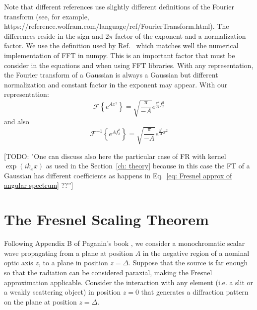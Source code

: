 \documentclass{iucr}              %
\newcommand{\todo}[1]{{\color{red}[TODO: "#1'']}}
\newcommand{\inblue}[1]{{\color{blue}#1}}
\begin{document}
Note that different references use slightly different definitions of the Fourier transform (see, for example, \inblue{https://reference.wolfram.com/language/ref/FourierTransform.html}). The differences reside in the sign and $2 \pi$ factor of the exponent and a normalization factor. We use the definition used by Ref.~\cite{goodmanfourier} which matches well the numerical implementation of FFT in numpy. This is an important factor that must be consider in the equations and when using FFT libraries. With any representation, the Fourier transform of a Gaussian is always a Gaussian but different normalization and constant factor in the exponent may appear. With our representation:
\begin{equation}
\mathcal{F}\left\{ e^{A x^2} \right\} = \sqrt{\frac{\pi}{-A}} e^{\frac{\pi^2}{A} f_x^2}
\end{equation}
and also
\begin{equation}
\mathcal{F}^{-1}\left\{ e^{A f_x^2} \right\} = \sqrt{\frac{\pi}{-A}} e^{\frac{\pi^2}{A} x^2}
\end{equation}

\todo{One can discuss also here the particular case of FR with kernel $\exp(ik_x x)$ as used in the Section~\ref{ch: theory} because in this case the FT of a Gaussian has different coefficients as happens in Eq.~\ref{eq: Fresnel approx of angular spectrum} ??}

\section{The Fresnel Scaling Theorem}
\label{appendix: scaling}

Following Appendix B of Paganin's book \cite{paganin_book}, we consider a monochromatic scalar wave propagating from a plane at position $A$ in the negative region of a nominal optic axis $z$, to a plane in position $z=\Delta$. Suppose that the source is far enough so that the radiation can be considered paraxial, making the Fresnel approximation applicable. Consider the interaction with any element (i.e. a slit or a weakly scattering object) in position $z=0$ that generates a diffraction pattern on the plane at position $z=\Delta$. 
\end{document}
